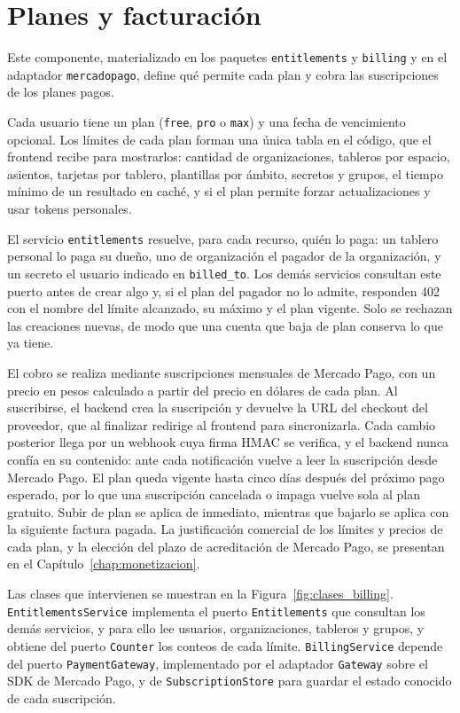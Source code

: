 \section{Planes y facturación}
\label{sec:planes_facturacion}
Este componente, materializado en los paquetes \texttt{entitlements} y \texttt{billing} y en el adaptador \texttt{mercadopago}, define qué permite cada plan y cobra las suscripciones de los planes pagos.

Cada usuario tiene un plan (\texttt{free}, \texttt{pro} o \texttt{max}) y una fecha de vencimiento opcional. Los límites de cada plan forman una única tabla en el código, que el frontend recibe para mostrarlos: cantidad de organizaciones, tableros por espacio, asientos, tarjetas por tablero, plantillas por ámbito, secretos y grupos, el tiempo mínimo de un resultado en caché, y si el plan permite forzar actualizaciones y usar tokens personales.

El servicio \texttt{entitlements} resuelve, para cada recurso, quién lo paga: un tablero personal lo paga su dueño, uno de organización el pagador de la organización, y un secreto el usuario indicado en \texttt{billed\_to}. Los demás servicios consultan este puerto antes de crear algo y, si el plan del pagador no lo admite, responden 402 con el nombre del límite alcanzado, su máximo y el plan vigente. Solo se rechazan las creaciones nuevas, de modo que una cuenta que baja de plan conserva lo que ya tiene.

El cobro se realiza mediante suscripciones mensuales de Mercado Pago, con un precio en pesos calculado a partir del precio en dólares de cada plan. Al suscribirse, el backend crea la suscripción y devuelve la URL del checkout del proveedor, que al finalizar redirige al frontend para sincronizarla. Cada cambio posterior llega por un webhook cuya firma HMAC se verifica, y el backend nunca confía en su contenido: ante cada notificación vuelve a leer la suscripción desde Mercado Pago. El plan queda vigente hasta cinco días después del próximo pago esperado, por lo que una suscripción cancelada o impaga vuelve sola al plan gratuito. Subir de plan se aplica de inmediato, mientras que bajarlo se aplica con la siguiente factura pagada. La justificación comercial de los límites y precios de cada plan, y la elección del plazo de acreditación de Mercado Pago, se presentan en el Capítulo~\ref{chap:monetizacion}.

Las clases que intervienen se muestran en la Figura~\ref{fig:clases_billing}. \texttt{EntitlementsService} implementa el puerto \texttt{Entitlements} que consultan los demás servicios, y para ello lee usuarios, organizaciones, tableros y grupos, y obtiene del puerto \texttt{Counter} los conteos de cada límite. \texttt{BillingService} depende del puerto \texttt{PaymentGateway}, implementado por el adaptador \texttt{Gateway} sobre el SDK de Mercado Pago, y de \texttt{SubscriptionStore} para guardar el estado conocido de cada suscripción.

